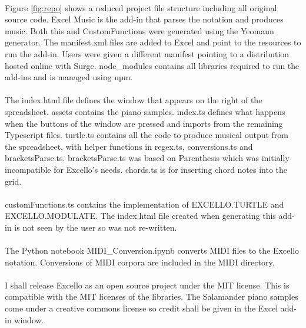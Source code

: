 \paragraph{} Figure \ref{fig:repo} shows a reduced project file structure including all original source code. Excel Music is the add-in that parses the notation and produces music. Both this and CustomFunctions were generated using the Yeomann generator. The manifest.xml files are added to Excel and point to the resources to run the add-in. Users were given a different manifest pointing to a distribution hosted online with Surge. node\_modules contains all libraries required to run the add-ins and is managed using npm.

\paragraph{} The index.html file defines the window that appears on the right of the spreadsheet. assets contains the piano samples. index.ts defines what happens when the buttons of the window are pressed and imports from the remaining Typescript files. turtle.ts contains all the code to produce musical output from the spreadsheet, with helper functions in regex.ts, conversions.ts and bracketsParse.ts. bracketsParse.ts was based on Parenthesis which was initially incompatible for Excello's needs. chords.ts is for inserting chord notes into the grid.

\paragraph{} customFunctions.ts contains the implementation of EXCELLO.TURTLE and EXCELLO.MODULATE. The index.html file created when generating this add-in is not seen by the user so was not re-written.

\paragraph{} The Python notebook MIDI\_Conversion.ipynb converts MIDI files to the Excello notation. Conversions of MIDI corpora are included in the MIDI directory.

\paragraph{} I shall release Excello as an open source project under the MIT license. This is compatible with the MIT licenses of the libraries. The Salamander piano samples come under a creative commons license so credit shall be given in the Excel add-in window.
